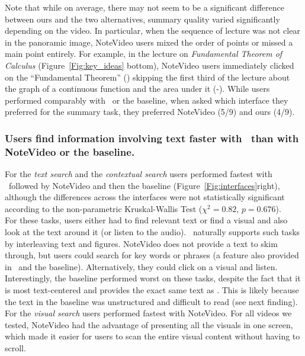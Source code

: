Note that while on average, there may not seem to be a significant difference
between ours and the two alternatives, summary quality varied
significantly depending on the video. In particular, when the sequence of lecture was not clear in the panoramic image, NoteVideo users mixed the order of points or missed a main point entirely. For example, in the lecture on \textit{Fundamental Theorem of Calculus} (Figure~\ref{Fig:key_ideas} bottom), NoteVideo users immediately clicked on the ``Fundamental Theorem'' () skipping the first third of the lecture about the graph of a continuous function and the area under it (-). While users performed comparably with \systemname\ or the baseline, when asked which interface they preferred for the summary task, they preferred NoteVideo (5/9) and ours (4/9). 

\subsubsection{Users find information involving text faster with \systemname\ than with NoteVideo or the baseline.}
For the \textit{text search} and  the \textit{contextual search} users performed fastest with \systemname\  followed by NoteVideo and then the baseline (Figure~\ref{Fig:interfaces}right), although the differences across the interfaces were not statistically significant according to the non-parametric Kruskal-Wallis Test ($\chi^2=0.82$,
$p=0.676$).\\ 

For these tasks, users either had to find relevant text or find a visual and also look at the text around it (or listen to the audio). \systemname\ naturally supports such tasks by  interleaving text and figures. NoteVideo does not provide a text to skim through, but users could search for key words or phrases (a feature also provided in \systemname\ and the baseline). Alternatively, they could click on a visual and listen. Interestingly, the baseline performed worst on these tasks, despite the fact that it is most text-centered and  provides the exact same text as \systemname . This is likely because the text in the baseline was unstructured and difficult to read (see next finding).\\

For the \textit{visual search} users performed fastest with NoteVideo. For
all videos we tested, NoteVideo had the advantage of presenting all the visuals
in one screen, which made it easier for users to scan the entire visual content
without having to scroll.\\

